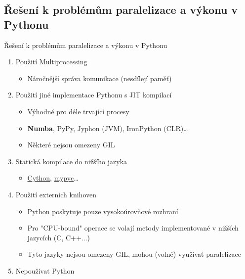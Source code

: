 \documentclass{beamer}
\begin{document}
\subsection{Řešení k problémům paralelizace a výkonu v Pythonu}
\begin{frame}{Řešení k problémům paralelizace a výkonu v Pythonu}
  \begin{enumerate}
    \item Použití Multiprocessing 
    \begin{itemize}
      \item [\textendash] Náročnější správa komunikace (nesdílejí paměť)
    \end{itemize}

    \item Použití jiné implementace Pythonu s JIT kompilací
    \begin{itemize}
      \item [\textendash] Výhodné pro déle trvající procesy
      \item [\textendash] \textbf{Numba}, PyPy, Jyphon (JVM), IronPython (CLR)\dots
      \item [\textendash] Některé nejsou omezeny GIL
    \end{itemize}

    \item Statická kompilace do nižšího jazyka
    \begin{itemize}
      \item [\textendash] \href{https://cython.org/}{Cython}, \href{https://github.com/mypyc/mypyc}{mypyc}\dots
    \end{itemize}

    \item Použití externích knihoven
    \begin{itemize}
      \item [\textendash] Python poskytuje pouze vysokoúrovňové rozhraní
      \item [\textendash] Pro "CPU-bound" operace se volají metody implementované v nižších jazycích (C, C++...)
      \item [\textendash] Tyto jazyky nejsou omezeny GIL, mohou (volně) využívat paralelizace
    \end{itemize}

    \item Nepoužívat Python
  \end{enumerate}
\end{frame}
\end{document}

